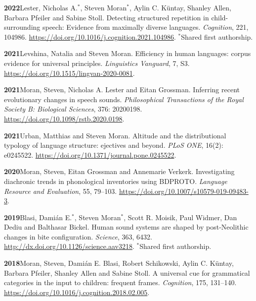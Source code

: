 \documentclass[11pt]{article}
\newcommand{\hangpara}{
 \setlength{\parindent}{0in} %
 \hangindent=0.42in %
}
\begin{document}
\hangpara
\vskip 6pt
{\bf 2022}\hspace{1ex}Lester, Nicholas A.$^*$, Steven Moran$^*$, Aylin C. K{\"u}ntay, Shanley Allen, Barbara Pfeiler and Sabine Stoll. Detecting structured repetition in child-surrounding speech: Evidence from maximally diverse languages. \textit{Cognition}, 221, 104986. \url{https://doi.org/10.1016/j.cognition.2021.104986}. $^*$Shared first authorship.

\hangpara
\vskip 6pt
{\bf 2021}\hspace{1ex}Levshina, Natalia and Steven Moran. Efficiency in human languages: corpus evidence for universal principles. \textit{Linguistics Vanguard}, 7, S3. \url{https://doi.org/10.1515/lingvan-2020-0081}.

\hangpara
\vskip 6pt
{\bf 2021}\hspace{1ex}Moran, Steven, Nicholas A. Lester and Eitan Grossman. Inferring recent evolutionary changes in speech sounds. \textit{Philosophical Transactions of the Royal Society B: Biological Sciences}, 376: 20200198. \url{https://doi.org/10.1098/rstb.2020.0198}.

\hangpara
\vskip 6pt
{\bf 2021}\hspace{1ex}Urban, Matthias and Steven Moran. Altitude and the distributional typology of language structure: ejectives and beyond. \textit{PLoS ONE}, 16(2): e0245522. \url{https://doi.org/10.1371/journal.pone.0245522}.

\hangpara
\vskip 6pt
{\bf 2020}\hspace{1ex}Moran, Steven, Eitan Grossman and Annemarie Verkerk. Investigating diachronic trends in phonological inventories using BDPROTO. \textit{Language Resource and Evaluation}, 55, 79--103. \url{https://doi.org/10.1007/s10579-019-09483-3}.

\hangpara
\vskip 6pt
{\bf 2019}\hspace{1ex}Blasi, Dami{\'a}n E.$^*$, Steven Moran$^*$, Scott R. Moisik, Paul Widmer, Dan Dediu and Balthasar Bickel. Human sound systems are shaped by post-Neolithic changes in bite configuration. \textit{Science}, 363, 6432. \url{http://dx.doi.org/10.1126/science.aav3218}. $^*$Shared first authorship. %

\hangpara
\vskip 6pt
{\bf 2018}\hspace{1ex}Moran, Steven, Dami{\'a}n E. Blasi, Robert Schikowski, Aylin C. K{\"u}ntay, Barbara Pfeiler, Shanley Allen and Sabine Stoll. A universal cue for grammatical categories in the input to children: frequent frames. \textit{Cognition}, 175, 131--140. \url{https://doi.org/10.1016/j.cognition.2018.02.005}. %
\end{document}
